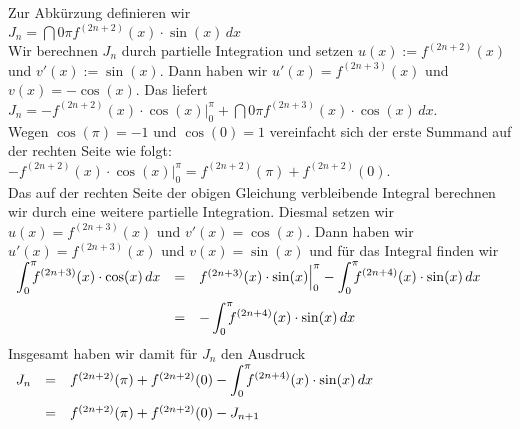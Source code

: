 \begin{enumerate}
     Zur Abk\"urzung definieren wir
     \\[0.2cm]
     \hspace*{1.3cm}
     $J_n = \dint{0}{\pi} f^{(2n+2)}(x) \cdot \sin(x)\, dx$
     \\[0.2cm]
     Wir berechnen $J_n$ durch partielle Integration und setzen $u(x) := f^{(2n+2)}(x)$ und
     $v'(x) := \sin(x)$.  Dann haben wir $u'(x) = f^{(2n+3)}(x)$ und $v(x) = -\cos(x)$.
     Das liefert
     \\[0.2cm]
     \hspace*{1.3cm}
     $J_n = - f^{(2n+2)}(x) \cdot \cos(x)\Bigr|_0^\pi + \dint{0}{\pi} f^{(2n+3)}(x) \cdot \cos(x)\, dx$.
     \\[0.2cm]
     Wegen $\cos(\pi) = -1$ und $\cos(0) = 1$ vereinfacht sich der erste Summand auf der rechten Seite
     wie folgt:
     \\[0.2cm]
     \hspace*{1.3cm}
     $- f^{(2n+2)}(x) \cdot \cos(x)\Bigr|_0^\pi =  f^{(2n+2)}(\pi) + f^{(2n+2)}(0)$.
     \\[0.2cm]
     Das auf der rechten Seite der obigen Gleichung verbleibende Integral berechnen wir durch eine
     weitere partielle Integration.  Diesmal setzen wir $u(x) = f^{(2n+3)}(x)$ und 
     $v'(x) = \cos(x)$.  Dann haben wir $u'(x) = f^{(2n+3)}(x)$ und $v(x) = \sin(x)$ und f\"ur das Integral
     finden wir
     \\[0.2cm]
     \hspace*{1.3cm}
     $
     \begin{array}[t]{lcl}
            \dint{0}{\pi} f^{(2n+3)}(x) \cdot \cos(x)\, dx  
      & = & f^{(2n+3)}(x) \cdot \sin(x)\Bigr|_0^\pi - \dint{0}{\pi} f^{(2n+4)}(x) \cdot \sin(x)\, dx  \\[0.4cm]
      & = &  - \dint{0}{\pi} f^{(2n+4)}(x) \cdot \sin(x)\, dx  \\[0.4cm]
     \end{array}
     $
     \\[0.2cm]
     Insgesamt haben wir damit f\"ur $J_n$ den Ausdruck
     \\[0.2cm]
     \hspace*{1.3cm}
     $
     \begin{array}[t]{lcl}
       J_n & = & f^{(2n+2)}(\pi) + f^{(2n+2)}(0) - \dint{0}{\pi} f^{(2n+4)}(x) \cdot \sin(x)\, dx \\[0.4cm]
           & = & f^{(2n+2)}(\pi) + f^{(2n+2)}(0) - J_{n+1}
     \end{array}
     $
     \\[0.2cm]

\end{enumerate}
